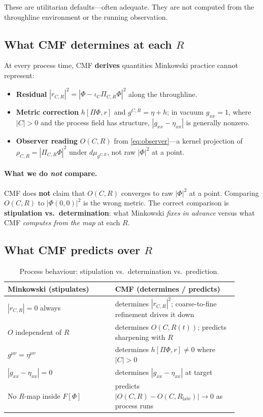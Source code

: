 \documentclass[11pt,a4paper]{article}
\newcommand{\Ph}{\Phi}
\begin{document}
These are utilitarian defaults---often adequate. They are not computed from the throughline environment or the running observation.

\subsection{What CMF determines at each \texorpdfstring{$R$}{R}}

At every process time, CMF \textbf{derives} quantities Minkowski practice cannot represent:
\begin{itemize}[noitemsep]
  \item \textbf{Residual} $|r_{C,R}|^2 = |\Ph - \iota_C \Pi_{C,R}\Ph|^2$ along the throughline.
  \item \textbf{Metric correction} $h[\Pi\Ph,r]$ and $g^{C,R}=\eta+h$; in vacuum $g_{xx}=1$, where $|C|>0$ and the process field has structure, $|g_{xx}-\eta_{xx}|$ is generally nonzero.
  \item \textbf{Observer reading} $O(C,R)$ from \eqref{eq:observer}---a kernel projection of $\rho_{C,R}=|\Pi_{C,R}\Ph|^2$ under $d\mu_{g^{C,R}}$, not raw $|\Ph|^2$ at a point.
\end{itemize}

\paragraph{What we do \emph{not} compare.}
CMF does \textbf{not} claim that $O(C,R)$ converges to raw $|\Ph|^2$ at a point. Comparing $O(C,R)$ to $|\Ph(0,0)|^2$ is the wrong metric. The correct comparison is \textbf{stipulation vs.\ determination}: what Minkowski \emph{fixes in advance} versus what CMF \emph{computes from the map} at each $R$.

\subsection{What CMF predicts over \texorpdfstring{$R$}{R}}

\begin{table}[h]
  \centering
  \caption{Process behaviour: stipulation vs.\ determination vs.\ prediction.}
  \label{tab:predictions}
  \begin{tabular}{@{}p{0.42\linewidth}p{0.48\linewidth}@{}}
    \toprule
    Minkowski (stipulates) & CMF (determines / predicts) \\
    \midrule
    $|r_{C,R}| = 0$ always & determines $|r_{C,R}|^2$; coarse-to-fine refinement drives it down \\
    $O$ independent of $R$ & determines $O(C,R(t))$; predicts sharpening with $R$ \\
    $g^{\mu\nu} = \eta^{\mu\nu}$ & determines $h[\Pi\Ph,r] \neq 0$ where $|C|>0$ \\
    $|g_{xx}-\eta_{xx}| = 0$ & determines $|g_{xx}-\eta_{xx}|$ at target \\
    No $R$-map inside $F[\Ph]$ & predicts $|O(C,R)-O(C,R_{\mathrm{late}})| \to 0$ as process runs \\
    \bottomrule
  \end{tabular}
\end{table}
\end{document}

